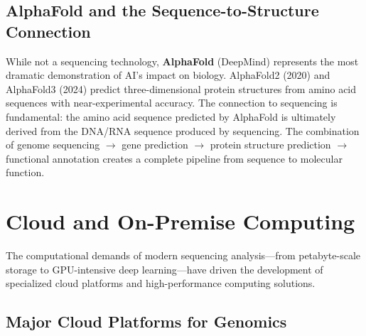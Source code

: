 \subsection{AlphaFold and the Sequence-to-Structure Connection}
\label{subsec:emerging:alphafold}

While not a sequencing technology, \textbf{AlphaFold} (DeepMind) represents the most dramatic demonstration of AI's impact on biology. AlphaFold2 (2020) and AlphaFold3 (2024) predict three-dimensional protein structures from amino acid sequences with near-experimental accuracy. The connection to sequencing is fundamental: the amino acid sequence predicted by AlphaFold is ultimately derived from the DNA/RNA sequence produced by sequencing. The combination of genome sequencing $\rightarrow$ gene prediction $\rightarrow$ protein structure prediction $\rightarrow$ functional annotation creates a complete pipeline from sequence to molecular function.


\section{Cloud and On-Premise Computing}
\label{sec:emerging:cloud}

The computational demands of modern sequencing analysis---from petabyte-scale storage to GPU-intensive deep learning---have driven the development of specialized cloud platforms and high-performance computing solutions.

\subsection{Major Cloud Platforms for Genomics}
\label{subsec:emerging:cloud-platforms}

